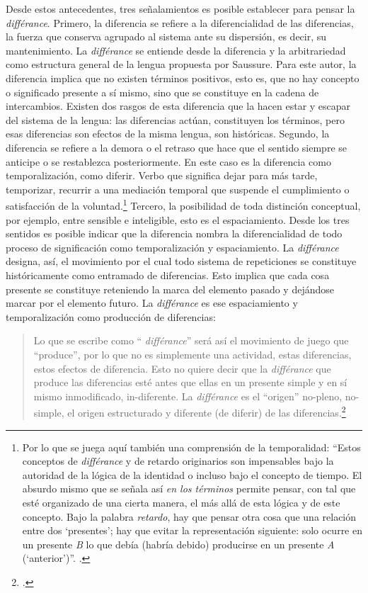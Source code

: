 Desde estos antecedentes, tres señalamientos es posible establecer para pensar la \emph{différance}. Primero, la diferencia se refiere a la diferencialidad de las diferencias, la fuerza que conserva agrupado al sistema ante su dispersión, es decir, su mantenimiento. La \emph{différance} se entiende desde la diferencia y la arbitrariedad como estructura general de la lengua propuesta por Saussure. Para este autor, la diferencia implica que no existen términos positivos, esto es, que no hay concepto o significado presente a sí mismo, sino que se constituye en la cadena de intercambios. Existen dos rasgos de esta diferencia que la hacen estar y escapar del sistema de la lengua: las diferencias actúan, constituyen los términos, pero esas diferencias son efectos de la misma lengua, son históricas. Segundo, la diferencia se refiere a la demora o el retraso que hace que el sentido siempre se anticipe o se restablezca posteriormente. En este caso es la diferencia como temporalización, como diferir. Verbo que significa dejar para más tarde, temporizar, recurrir a una mediación temporal que suspende el cumplimiento o satisfacción de la voluntad.\footnote{Por lo que se juega aquí también una comprensión de la temporalidad: \enquote{Estos conceptos de \emph{différance} y de retardo originarios son impensables bajo la autoridad de la lógica de la identidad o incluso bajo el concepto de tiempo. El absurdo mismo que se señala así \emph{en los términos} permite pensar, con tal que esté organizado de una cierta manera, el más allá de esta lógica y de este concepto. Bajo la palabra \emph{retardo}, hay que pensar otra cosa que una relación entre dos \enquote{presentes}; hay que evitar la representación siguiente: solo ocurre en un presente \textit{B} lo que debía (habría debido) producirse en un presente \textit{A} (\enquote{anterior})}. \cite[280]{@6987-DERRIDA1989}.} Tercero, la posibilidad de toda distinción conceptual, por ejemplo, entre sensible e inteligible, esto es el espaciamiento. Desde los tres sentidos es posible indicar que la diferencia nombra la diferencialidad de todo proceso de significación como temporalización y espaciamiento. La \emph{différance} designa, así, el movimiento por el cual todo sistema de repeticiones se constituye históricamente como entramado de diferencias. Esto implica que cada cosa presente se constituye reteniendo la marca del elemento pasado y dejándose marcar por el elemento futuro. La \emph{différance} es ese espaciamiento y temporalización como producción de diferencias:

\begin{quote}
Lo que se escribe como \enquote{ \emph{différance}} será así el movimiento de juego que \enquote{produce}, por lo que no es simplemente una actividad, estas diferencias, estos efectos de diferencia. Esto no quiere decir que la \emph{différance} que produce las diferencias esté antes que ellas en un presente simple y en sí mismo inmodificado, in-diferente. La \emph{différance} es el \enquote{origen} no-pleno, no-simple, el origen estructurado y diferente (de diferir) de las diferencias.\footcite[12]{@6987-DERRIDA1989}
\end{quote}

